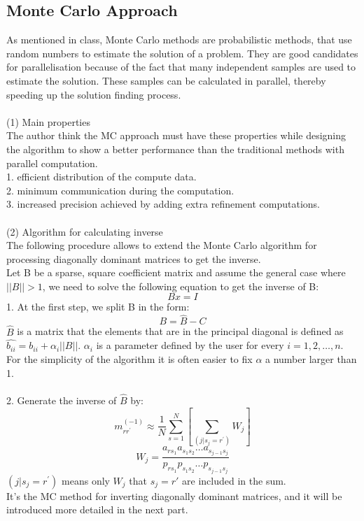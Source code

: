 \documentclass[10pt,journal]{IEEEtran}
\begin{document}
\subsection{Monte Carlo Approach}
As mentioned in class, Monte Carlo methods are probabilistic methods, that use random numbers to estimate the solution of a problem. They are good candidates for parallelisation because of the fact that many independent samples are used to estimate the solution. These samples can be calculated in parallel, thereby speeding up the solution finding process.\\\\
(1) Main properties\\
The author think the MC approach must have these properties while designing the algorithm to show a better performance than the traditional methods with parallel computation.\\
1. efficient distribution of the compute data.\\
2. minimum communication during the computation.\\
3. increased precision achieved by adding extra refinement computations.\\\\
(2) Algorithm for calculating inverse\\
The following procedure allows to extend the Monte Carlo algorithm for processing diagonally dominant matrices to get the inverse. \\
Let B be a sparse, square coefficient matrix and assume the general case where $||B||>1$, we need to solve the following equation to get the inverse of B:
\[Bx=I\]
1. At the first step, we split B in the form:
\[B=\hat{B}-C\]
$\hat{B}$ is a matrix that the elements that are in the principal diagonal is defined as $\hat{b_{ii}}=b_{ii}+\alpha_i||B||$. $\alpha_i$ is a parameter defined by the user for every $i=1, 2, \ldots, n$. For the simplicity of the algorithm it is often easier to fix $\alpha$ a number larger than 1.\\\\
2. Generate the inverse of $\hat{B}$ by:
\[m _ { r r ^ { \prime } } ^ { ( - 1 ) } \approx \frac { 1 } { N } \sum _ { s = 1 } ^ { N } \left[ \sum _ { ( j | s _ { j } = r ^ { \prime } ) } W _ { j } \right]\]
\[W _ { j } = \frac { a _ { r s _ { 1 } } a _ { s _ { 1 } s _ { 2 } } \dots a _ { s _ { j - 1 } s _ { j } } } { p _ { r s _ { 1 } } p _ { s _ { 1 } s _ { 2 } } \ldots p _ { s _ { j - 1 } s _ { j } } }\]
$( j | s _ { j } = r ^ { \prime })$ means only $W_j$ that $s_j=r'$ are included in the sum.\\It's the MC method for inverting diagonally dominant matrices, and it will be introduced more detailed in the next part.\\\\
\end{document}
